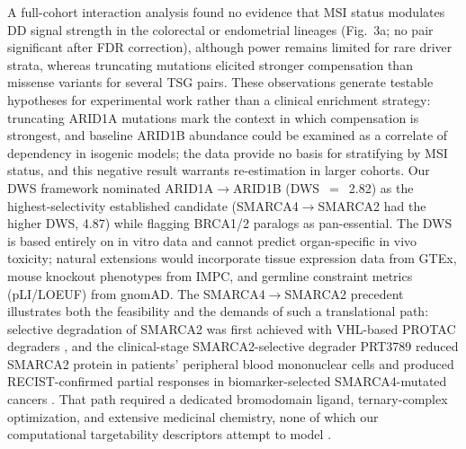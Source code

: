\documentclass[11pt,a4paper]{article}
\begin{document}
A full-cohort interaction analysis found no evidence that MSI status modulates DD signal strength in the colorectal or endometrial lineages (Fig.~3a; no pair significant after FDR correction), although power remains limited for rare driver strata, whereas truncating mutations elicited stronger compensation than missense variants for several TSG pairs. These observations generate testable hypotheses for experimental work rather than a clinical enrichment strategy: truncating ARID1A mutations mark the context in which compensation is strongest, and baseline ARID1B abundance could be examined as a correlate of dependency in isogenic models; the data provide no basis for stratifying by MSI status, and this negative result warrants re-estimation in larger cohorts. Our DWS framework nominated ARID1A$\rightarrow$ARID1B (DWS~$=$~2.82) as the highest-selectivity established candidate (SMARCA4$\rightarrow$SMARCA2 had the higher DWS, 4.87) while flagging BRCA1/2 paralogs as pan-essential. The DWS is based entirely on in vitro data and cannot predict organ-specific in vivo toxicity; natural extensions would incorporate tissue expression data from GTEx, mouse knockout phenotypes from IMPC, and germline constraint metrics (pLI/LOEUF) from gnomAD. The SMARCA4$\rightarrow$SMARCA2 precedent illustrates both the feasibility and the demands of such a translational path: selective degradation of SMARCA2 was first achieved with VHL-based PROTAC degraders \cite{Farnaby2019,Kofink2022}, and the clinical-stage SMARCA2-selective degrader PRT3789 reduced SMARCA2 protein in patients' peripheral blood mononuclear cells and produced RECIST-confirmed partial responses in biomarker-selected SMARCA4-mutated cancers \cite{Hulse2026}. That path required a dedicated bromodomain ligand, ternary-complex optimization, and extensive medicinal chemistry, none of which our computational targetability descriptors attempt to model \cite{Goncalves2026}.
\end{document}
